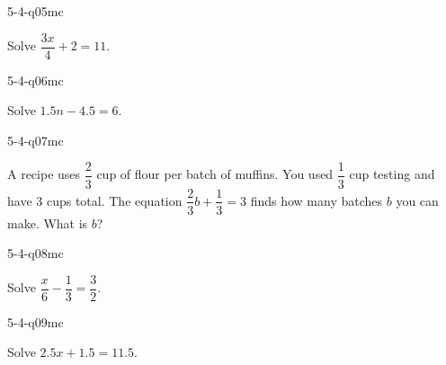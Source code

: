 \begin{practiceQuestion}{5-4-q05}{mc}
\begin{questionText}
Solve $\dfrac{3x}{4} + 2 = 11$.
\end{questionText}
\end{practiceQuestion}

\begin{practiceQuestion}{5-4-q06}{mc}
\begin{questionText}
Solve $1.5n - 4.5 = 6$.
\end{questionText}
\end{practiceQuestion}

\begin{practiceQuestion}{5-4-q07}{mc}
\begin{questionText}
A recipe uses $\dfrac{2}{3}$ cup of flour per batch of muffins. You used $\dfrac{1}{3}$ cup testing and have $3$ cups total. The equation $\dfrac{2}{3}b + \dfrac{1}{3} = 3$ finds how many batches $b$ you can make. What is $b$?
\end{questionText}
\end{practiceQuestion}

\begin{practiceQuestion}{5-4-q08}{mc}
\begin{questionText}
Solve $\dfrac{x}{6} - \dfrac{1}{3} = \dfrac{3}{2}$.
\end{questionText}
\end{practiceQuestion}

\begin{practiceQuestion}{5-4-q09}{mc}
\begin{questionText}
Solve $2.5x + 1.5 = 11.5$.
\end{questionText}
\end{practiceQuestion}


